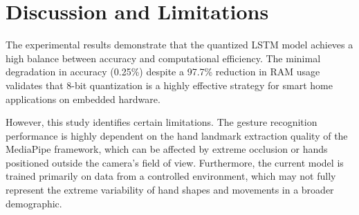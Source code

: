 \section{Discussion and Limitations}
The experimental results demonstrate that the quantized LSTM model achieves a high balance between accuracy and computational efficiency. The minimal degradation in accuracy (0.25\%) despite a 97.7\% reduction in RAM usage validates that 8-bit quantization is a highly effective strategy for smart home applications on embedded hardware. 

However, this study identifies certain limitations. The gesture recognition performance is highly dependent on the hand landmark extraction quality of the MediaPipe framework, which can be affected by extreme occlusion or hands positioned outside the camera's field of view. Furthermore, the current model is trained primarily on data from a controlled environment, which may not fully represent the extreme variability of hand shapes and movements in a broader demographic.